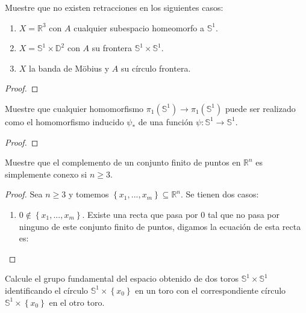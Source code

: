 \documentclass[12pt]{report}
\newcounter{it}
\theoremstyle{largebreak}
\newcommand\cf[3]{\ensuremath{#1:#2\rightarrow#3}}
\begin{document}
    \begin{excer}
        Muestre que no existen retracciones en los siguientes casos:
        \begin{enumerate}[label = \textit{(\alph*)}]
            \item $X=\mathbb{R}^3$ con $A$ cualquier subespacio homeomorfo a $\mathbb{S}^1$.
            \item $X=\mathbb{S}^1\times\mathbb{D}^2$ con $A$ su frontera $\mathbb{S}^1\times\mathbb{S}^1$.
            \item $X$ la banda de Möbius y $A$ su círculo frontera.
        \end{enumerate}
    \end{excer}

    \begin{proof}
        
    \end{proof}

    \begin{excer}
        Muestre que cualquier homomorfismo $\pi_1(\mathbb{S}^1)\rightarrow\pi_1(\mathbb{S}^1)$ puede ser realizado como el homomorfismo inducido $\psi_*$ de una función $\cf{\psi}{\mathbb{S}^1}{\mathbb{S}^1}$.
    \end{excer}

    \begin{proof}
        
    \end{proof}

    \begin{excer}
        Muestre que el complemento de un conjunto finito de puntos en $\mathbb{R}^n$ es simplemente conexo si $n\geq 3$.
    \end{excer}

    \begin{proof}
        Sea $n\geq 3$ y tomemos $\left\{x_1,...,x_m \right\}\subseteq\mathbb{R}^n$. Se tienen dos casos:
        \begin{enumerate}
            \item $0\notin\left\{x_1,...,x_m \right\}$. Existe una recta que pasa por 0 tal que no pasa por ninguno de este conjunto finito de puntos, digamos la ecuación de esta recta es:
            
        \end{enumerate}
    \end{proof}

    \begin{excer}
        Calcule el grupo fundamental del espacio obtenido de dos toros $\mathbb{S}^1\times\mathbb{S}^1$ identificando el círculo $\mathbb{S}^1\times\left\{x_0\right\}$ en un toro con el correspondiente círculo $\mathbb{S}^1\times\left\{x_0\right\}$ en el otro toro.
    \end{excer}
\end{document}
